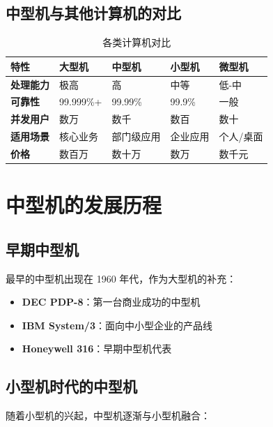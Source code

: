 \documentclass[12pt,UTF8]{ctexbook}
\begin{document}
\section{中型机与其他计算机的对比}

\begin{table}[htbp]
    \centering
    \caption{各类计算机对比}
    \begin{tabular}{|p{2cm}|p{2cm}|p{2cm}|p{2cm}|p{2cm}|}
        \hline
        \textbf{特性} & \textbf{大型机} & \textbf{中型机} & \textbf{小型机} & \textbf{微型机} \\
        \hline
        \textbf{处理能力} & 极高 & 高 & 中等 & 低-中 \\
        \hline
        \textbf{可靠性} & 99.999\%+ & 99.99\% & 99.9\% & 一般 \\
        \hline
        \textbf{并发用户} & 数万 & 数千 & 数百 & 数十 \\
        \hline
        \textbf{适用场景} & 核心业务 & 部门级应用 & 企业应用 & 个人/桌面 \\
        \hline
        \textbf{价格} & 数百万 & 数十万 & 数万 & 数千元 \\
        \hline
    \end{tabular}
\end{table}

\chapter{中型机的发展历程}
\label{chap:history}

\section{早期中型机}

最早的中型机出现在 1960 年代，作为大型机的补充：

\begin{itemize}[leftmargin=2cm]
    \item \textbf{DEC PDP-8}：第一台商业成功的中型机
    \item \textbf{IBM System/3}：面向中小型企业的产品线
    \item \textbf{Honeywell 316}：早期中型机代表
\end{itemize}

\section{小型机时代的中型机}

随着小型机的兴起，中型机逐渐与小型机融合：
\end{document}
